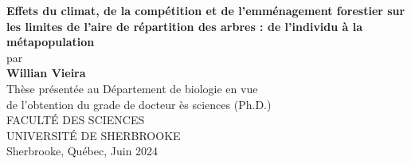 \documentclass[12pt,oneside]{book}
\newcommand{\blankpage}{	%
\newpage
\thispagestyle{empty}
\mbox{}
\newpage
}
\begin{document}
\blankpage


\renewcommand{\figurename}{Figure}
\renewcommand{\tablename}{Table} 		%
\renewcommand{\chaptername}{CHAPITRE} 
\renewcommand{\contentsname}{TABLE DES MATIÈRES}
\renewcommand{\listtablename}{LISTE DES TABLEAUX}
\renewcommand{\listfigurename}{LISTE DES FIGURES}



\begin{center}
{
{\textbf{Effets du climat, de la compétition et de l'emménagement forestier sur les limites de l'aire de répartition des arbres : de l'individu à la métapopulation}} %
\\  \vspace{2.5cm}
par
\\   \vspace{2.5cm}
{\textbf{Willian Vieira}} %
\\   \vspace{2.5cm}
Thèse présentée au Département de biologie en vue\\
de l'obtention du grade de docteur ès sciences (Ph.D.)\\
\vfill
FACULTÉ DES SCIENCES\\
UNIVERSITÉ DE SHERBROOKE\\  \vspace{1.5cm}
\vfill
Sherbrooke, Québec, Juin 2024
}

\end{center}


\end{document}

